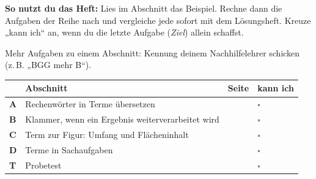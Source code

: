 \documentclass[11pt]{article}
\begin{document}
\par\smallskip
{}\par\medskip
\noindent\textbf{So nutzt du das Heft:} Lies im Abschnitt das Beispiel. Rechne dann die Aufgaben der Reihe nach und vergleiche jede sofort mit dem Lösungsheft. Kreuze „kann ich“ an, wenn du die letzte Aufgabe (\emph{Ziel}) allein schaffst.\par
\noindent Mehr Aufgaben zu einem Abschnitt: Kennung deinem Nachhilfelehrer schicken (z.\,B. „BGG mehr B“).\par\medskip
{\renewcommand{\arraystretch}{1.3}
\noindent\begin{tabular}{|>{\bfseries}p{10mm}|p{112mm}|>{\raggedleft\arraybackslash}p{10mm}|>{\centering\arraybackslash}p{14mm}|}\hline
\rowcolor{black!8} & \textbf{Abschnitt} & \textbf{Seite} & \textbf{kann ich}\\\hline
A & Rechenwörter in Terme übersetzen & \pageref{s:A} & $\square$\\\hline
B & Klammer, wenn ein Ergebnis weiterverarbeitet wird & \pageref{s:B} & $\square$\\\hline
C & Term zur Figur: Umfang und Flächeninhalt & \pageref{s:C} & $\square$\\\hline
D & Terme in Sachaufgaben & \pageref{s:D} & $\square$\\\hline
T & Probetest & \pageref{s:T} & $\square$\\\hline
\end{tabular}}\par\bigskip
\end{document}
